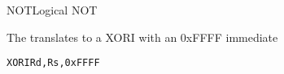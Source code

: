 \begin{instruction}{NOT}{Logical NOT}
\begin{remarks}
The translates to a XORI with an 0xFFFF immediate 
\begin{alltt}
    XORI Rd, Rs, 0xFFFF
\end{alltt}
\end{remarks}
\end{instruction}
